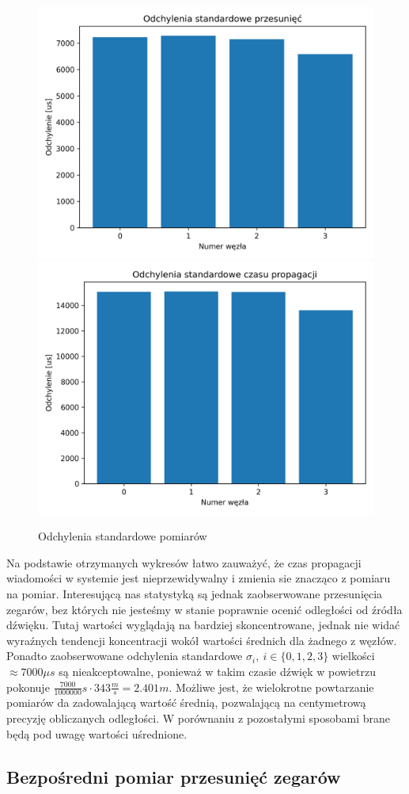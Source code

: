 \begin{figure}[h]
\centering
    \includegraphics[width=.49\textwidth]{pics/ntp_sync/stddev_offsets.png}
    \includegraphics[width=.49\textwidth]{pics/ntp_sync/stddev_prop.png}
\caption{Odchylenia standardowe pomiarów}
\label{pic:stddev_ntp}
\end{figure}

Na podstawie otrzymanych wykresów łatwo zauważyć, że czas propagacji wiadomości w systemie jest nieprzewidywalny i zmienia sie znacząco z pomiaru na pomiar. Interesującą nas statystyką są jednak zaobserwowane przesunięcia zegarów, bez których nie jesteśmy w stanie poprawnie ocenić odległości od źródła dźwięku. Tutaj wartości wyglądają na bardziej skoncentrowane, jednak nie widać wyraźnych tendencji koncentracji wokół wartości średnich dla żadnego z węzłów. Ponadto zaobserwowane odchylenia standardowe $\sigma_i,\ i \in \{0,1,2,3\}$ wielkości $\approx 7000 \mu s$ są nieakceptowalne, ponieważ w takim czasie dźwięk w powietrzu pokonuje $\frac{7000}{1000000}s \cdot 343\frac{m}{s} = 2.401m$. Możliwe jest, że wielokrotne powtarzanie pomiarów da zadowalającą wartość średnią, pozwalającą na centymetrową precyzję obliczanych odległości. W porównaniu z pozostałymi sposobami brane będą pod uwagę wartości uśrednione.

\subsection{Bezpośredni pomiar przesunięć zegarów}\label{sec:time_deltas_sync}


